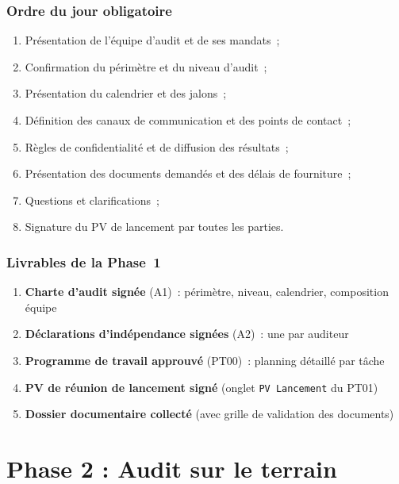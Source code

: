 \documentclass[12pt,a4paper,oneside]{report}
\begin{document}
\subsubsection{Ordre du jour obligatoire}

\begin{enumerate}[leftmargin=*, itemsep=2pt]
\item Pr\'esentation de l'\'equipe d'audit et de ses mandats~;
\item Confirmation du p\'erim\`etre et du niveau d'audit~;
\item Pr\'esentation du calendrier et des jalons~;
\item D\'efinition des canaux de communication et des points de contact~;
\item R\`egles de confidentialit\'e et de diffusion des r\'esultats~;
\item Pr\'esentation des documents demand\'es et des d\'elais de fourniture~;
\item Questions et clarifications~;
\item Signature du PV de lancement par toutes les parties.
\end{enumerate}

\subsubsection{Livrables de la Phase~1}

\begin{goldbox}[title={\color{navy}\bfseries Livrables obligatoires de la Phase~1}]
\begin{enumerate}[leftmargin=*, itemsep=3pt]
\item \textbf{Charte d'audit sign\'ee} (A1)~: p\'erim\`etre, niveau, calendrier, composition \'equipe
\item \textbf{D\'eclarations d'ind\'ependance sign\'ees} (A2)~: une par auditeur
\item \textbf{Programme de travail approuv\'e} (PT00)~: planning d\'etaill\'e par t\^ache
\item \textbf{PV de r\'eunion de lancement sign\'e} (onglet \texttt{PV Lancement} du PT01)
\item \textbf{Dossier documentaire collect\'e} (avec grille de validation des documents)
\end{enumerate}
\end{goldbox}

\section{Phase 2 : Audit sur le terrain}
\label{sec:phase2}
\end{document}
